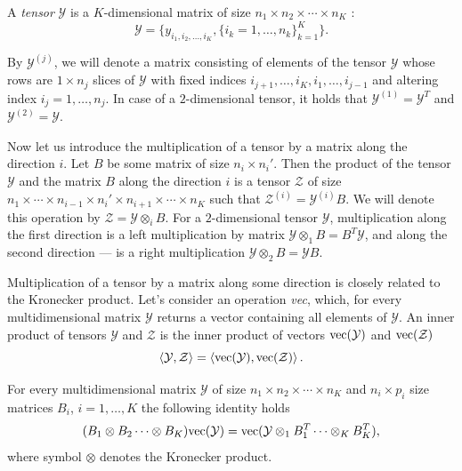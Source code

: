 A {\em tensor} $\mathcal{Y}$ is a $K$-dimensional matrix of size $n_1 \times n_2 \times \cdots \times n_K$
\citep{kolda09tensordecompositions}:
\begin{equation}
  \label{eq:tensor}
  \mathcal{Y} = \{ y_{i_1, i_2, \ldots, i_K}, \{i_k = 1, \ldots, n_k \}_{k = 1}^K \}.
\end{equation}

By $\mathcal{Y}^{(j)}$, we will denote a matrix consisting of elements of the tensor $\mathcal{Y}$
whose rows are $1 \times n_j$ slices of $\mathcal{Y}$ with fixed indices
$i_{j + 1}, \ldots, i_K, i_1, \ldots, i_{j - 1}$ and altering index $i_j = 1, \ldots, n_j$.
In case of a $2$-dimensional tensor, it holds that
${\mathcal{Y}^{(1)} = \mathcal{Y}^T}$ and $\mathcal{Y}^{(2)} = \mathcal{Y}$.

Now let us introduce the multiplication of a tensor by a matrix along the direction $i$.
Let $B$ be some matrix of size $n_i \times n_i'$.
Then the product of the tensor $\mathcal{Y}$ and the matrix $B$ along the direction $i$
is a tensor $\mathcal{Z}$ of size $n_1 \times \cdots \times n_{i - 1} \times n_i' \times n_{i + 1} \times \cdots \times n_K$
such that $\mathcal{Z}^{(i)} = \mathcal{Y}^{(i)}B$.
We will denote this operation by $\mathcal{Z} = \mathcal{Y} \otimes_i B$.
For a $2$-dimensional tensor $\mathcal{Y}$, multiplication along the first direction is a left multiplication
by matrix $\mathcal{Y} \otimes_1 B = B^T \mathcal{Y}$,
and along the second direction --- is a right multiplication $\mathcal{Y} \otimes_2 B = \mathcal{Y} B$.

Multiplication of a tensor by a matrix along some direction is closely related to the Kronecker product.
Let's consider an operation {\em vec}, which, for every multidimensional matrix $\mathcal{Y}$
returns a vector containing all elements of $\mathcal{Y}$.
An inner product of tensors $\mathcal{Y}$ and $\mathcal{Z}$ is the inner product of vectors
${\rm vec}(\mathcal{Y})$ and ${\rm vec}(\mathcal{Z})$
\[
\left < \mathcal{Y}, \mathcal{Z}\right > = \left < {\rm vec}(\mathcal{Y}), {\rm vec}(\mathcal{Z}) \right >.
\]

For every multidimensional matrix $\mathcal{Y}$ of size $n_1 \times n_2 \times \cdots \times n_K$
and $n_i \times p_i$ size matrices $B_i$, $i = 1, \ldots, K$ the following identity holds \citep{loan2000kronecker}
\begin{equation}
  \label{eq:kronecker_product}
    (B_1 \otimes B_2 \cdots \otimes B_K) {\rm vec}(\mathcal{Y}) =
    {\rm vec} (\mathcal{Y} \otimes_1 B_1^T \cdots \otimes_K B_K^T),
\end{equation}
where symbol $\otimes$ denotes the Kronecker product.

